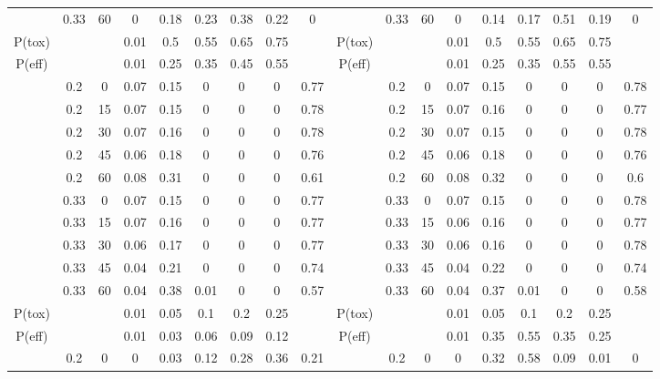 \begin{table}
{\begin{tabular}[t]{cccccccc>{}c|ccccccccc}
			\multirow{-10}{*}{\centering\arraybackslash 1} & 0.33 & 60 & 0 & 0.18 & 0.23 & 0.38 & 0.22 & 0 & \multirow{-10}{*}{\centering\arraybackslash 7} & 0.33 & 60 & 0 & 0.14 & 0.17 & 0.51 & 0.19 & 0\\
			\cmidrule{1-18}
			P(tox) &  &  & 0.01 & 0.5 & 0.55 & 0.65 & 0.75 &  & P(tox) &  &  & 0.01 & 0.5 & 0.55 & 0.65 & 0.75 \vphantom{2} & \\
			\cmidrule{1-18}
			P(eff) &  &  & 0.01 & 0.25 & 0.35 & 0.45 & 0.55 &  & P(eff) &  &  & 0.01 & 0.25 & 0.35 & 0.55 & 0.55 & \\
			\cmidrule{1-18}
			& 0.2 & 0 & 0.07 & 0.15 & 0 & 0 & 0 & 0.77 &  & 0.2 & 0 & 0.07 & 0.15 & 0 & 0 & 0 & 0.78\\
			
			& 0.2 & 15 & 0.07 & 0.15 & 0 & 0 & 0 & 0.78 &  & 0.2 & 15 & 0.07 & 0.16 & 0 & 0 & 0 & 0.77\\
			
			& 0.2 & 30 & 0.07 & 0.16 & 0 & 0 & 0 & 0.78 &  & 0.2 & 30 & 0.07 & 0.15 & 0 & 0 & 0 & 0.78\\
			
			& 0.2 & 45 & 0.06 & 0.18 & 0 & 0 & 0 & 0.76 &  & 0.2 & 45 & 0.06 & 0.18 & 0 & 0 & 0 & 0.76\\
			
			& 0.2 & 60 & 0.08 & 0.31 & 0 & 0 & 0 & 0.61 &  & 0.2 & 60 & 0.08 & 0.32 & 0 & 0 & 0 & 0.6\\
			
			& 0.33 & 0 & 0.07 & 0.15 & 0 & 0 & 0 & 0.77 &  & 0.33 & 0 & 0.07 & 0.15 & 0 & 0 & 0 & 0.78\\
			
			& 0.33 & 15 & 0.07 & 0.16 & 0 & 0 & 0 & 0.77 &  & 0.33 & 15 & 0.06 & 0.16 & 0 & 0 & 0 & 0.77\\
			
			& 0.33 & 30 & 0.06 & 0.17 & 0 & 0 & 0 & 0.77 &  & 0.33 & 30 & 0.06 & 0.16 & 0 & 0 & 0 & 0.78\\
			
			& 0.33 & 45 & 0.04 & 0.21 & 0 & 0 & 0 & 0.74 &  & 0.33 & 45 & 0.04 & 0.22 & 0 & 0 & 0 & 0.74\\
			
			\multirow{-10}{*}{\centering\arraybackslash 2} & 0.33 & 60 & 0.04 & 0.38 & 0.01 & 0 & 0 & 0.57 & \multirow{-10}{*}{\centering\arraybackslash 8} & 0.33 & 60 & 0.04 & 0.37 & 0.01 & 0 & 0 & 0.58\\
			\cmidrule{1-18}
			P(tox) &  &  & 0.01 & 0.05 & 0.1 & 0.2 & 0.25 &  & P(tox) &  &  & 0.01 & 0.05 & 0.1 & 0.2 & 0.25 \vphantom{1} & \\
			\cmidrule{1-18}
			P(eff) &  &  & 0.01 & 0.03 & 0.06 & 0.09 & 0.12 &  & P(eff) &  &  & 0.01 & 0.35 & 0.55 & 0.35 & 0.25 \vphantom{1} & \\
			\cmidrule{1-18}
			& 0.2 & 0 & 0 & 0.03 & 0.12 & 0.28 & 0.36 & 0.21 &  & 0.2 & 0 & 0 & 0.32 & 0.58 & 0.09 & 0.01 & 0\\
			

\end{tabular}}
\end{table}
